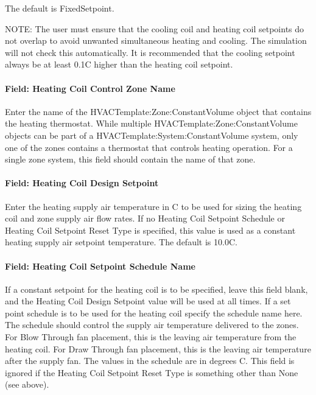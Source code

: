 The default is FixedSetpoint.

NOTE: The user must ensure that the cooling coil and heating coil setpoints do not overlap to avoid unwanted simultaneous heating and cooling. The simulation will not check this automatically. It is recommended that the cooling setpoint always be at least 0.1C higher than the heating coil setpoint.

\paragraph{Field: Heating Coil Control Zone Name}\label{field-heating-coil-control-zone-name}

Enter the name of the HVACTemplate:Zone:ConstantVolume object that contains the heating thermostat. While multiple HVACTemplate:Zone:ConstantVolume objects can be part of a HVACTemplate:System:ConstantVolume system, only one of the zones contains a thermostat that controls heating operation. For a single zone system, this field should contain the name of that zone.

\paragraph{Field: Heating Coil Design Setpoint}\label{field-heating-coil-design-setpoint-3}

Enter the heating supply air temperature in C to be used for sizing the heating coil and zone supply air flow rates. If no Heating Coil Setpoint Schedule or Heating Coil Setpoint Reset Type is specified, this value is used as a constant heating supply air setpoint temperature. The default is 10.0C.

\paragraph{Field: Heating Coil Setpoint Schedule Name}\label{field-heating-coil-setpoint-schedule-name-2}

If a constant setpoint for the heating coil is to be specified, leave this field blank, and the Heating Coil Design Setpoint value will be used at all times. If a set point schedule is to be used for the heating coil specify the schedule name here. The schedule should control the supply air temperature delivered to the zones. For Blow Through fan placement, this is the leaving air temperature from the heating coil. For Draw Through fan placement, this is the leaving air temperature after the supply fan. The values in the schedule are in degrees C. This field is ignored if the Heating Coil Setpoint Reset Type is something other than None (see above).

